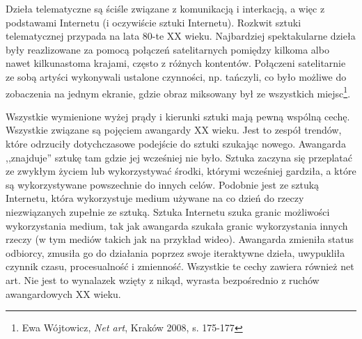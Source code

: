 \documentclass[a4paper,12pt,twoside]{article}
\begin{document}
Dzieła telematyczne są ściśle związane z komunikacją i interkacją, a więc
z podstawami Internetu (i oczywiście sztuki Internetu). Rozkwit sztuki
telematycznej przypada na lata 80-te XX wieku. Najbardziej spektakularne
dzieła były reazlizowane za pomocą połączeń satelitarnych pomiędzy kilkoma
albo nawet kilkunastoma krajami, często z różnych kontentów. Połączeni
satelitarnie ze sobą artyści wykonywali ustalone czynności, np. tańczyli,
co było możliwe do zobaczenia na jednym ekranie, gdzie obraz miksowany był ze
wszystkich miejsc\footnote{ Ewa Wójtowicz, \textit{Net art}, Kraków 2008,
s. 175-177}.

Wszystkie wymienione wyżej prądy i kierunki sztuki mają pewną wspólną cechę.
Wszystkie związane są pojęciem awangardy XX wieku. Jest to zespół trendów,
które odrzuciły dotychczasowe podejście do sztuki szukając nowego.
Awangarda ,,znajduje'' sztukę tam gdzie jej wcześniej nie było. Sztuka
zaczyna się przeplatać ze zwykłym życiem lub wykorzystywać środki, którymi
wcześniej gardziła, a które są wykorzystywane powszechnie do innych celów.
Podobnie jest ze sztuką Internetu, która wykorzystuje medium używane na co
dzień do rzeczy niezwiązanych zupełnie ze sztuką. Sztuka Internetu szuka
granic możliwości wykorzystania medium, tak jak awangarda szukała granic
wykorzystania innych rzeczy (w tym mediów takich jak na przykład wideo).
Awangarda zmieniła status odbiorcy, zmusiła go do działania poprzez
swoje iteraktywne dzieła, uwypukliła czynnik czasu, procesualność i zmienność.
Wszystkie te cechy zawiera również net art. Nie jest to wynalazek wzięty
z nikąd, wyrasta bezpośrednio z ruchów awangardowych XX wieku.

\end{document}
